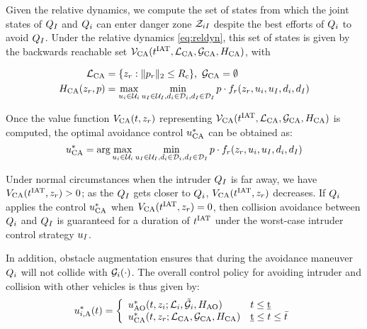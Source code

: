 Given the relative dynamics, we compute the set of states from which the joint states of $Q_{I}$ and $Q_i$ can enter danger zone $\mathcal{Z}_{iI}$ despite the best efforts of $Q_i$ to avoid $Q_{I}$. Under the relative dynamics \eqref{eq:reldyn}, this set of states is given by the backwards reachable set $\mathcal{V}_\text{CA}(t^\text{IAT}, \mathcal{L}_\text{CA}, \mathcal{G}_\text{CA}, H_\text{CA})$, with

\begin{equation}
\begin{aligned}
\mathcal{L}_\text{CA} &= \{z_r: \|p_r\|_2 \le R_c\},~\mathcal{G}_\text{CA} = \emptyset \\
H_\text{CA}(z_r, p) &= \max_{u_i \in \mathcal{U}_i} \min_{u_I \in \mathcal{U}_I, d_i \in \mathcal{D}_i, d_I \in \mathcal{D}_I} p \cdot f_r(z_r, u_i, u_I, d_i, d_I)
\end{aligned}
\end{equation}

Once the value function $V_\text{CA}(t, z_r)$ representing $\mathcal{V}_\text{CA}(t^\text{IAT}, \mathcal{L}_\text{CA}, \mathcal{G}_\text{CA}, H_\text{CA})$ is computed, the optimal avoidance control $u^*_\text{CA}$ can be obtained as:
\begin{equation}
u^*_\text{CA} = \arg \max_{u_i \in \mathcal{U}_i} \min_{u_I \in \mathcal{U}_I, d_i \in \mathcal{D}_i, d_I \in \mathcal{D}_I} p \cdot f_r(z_r, u_i, u_I, d_i, d_I)
\end{equation}

Under normal circumstances when the intruder $Q_{I}$ is far away, we have $V_\text{CA}(t^\text{IAT}, z_r) > 0$; as the $Q_{I}$ gets closer to $Q_i$, $V_\text{CA}(t^\text{IAT}, z_r)$ decreases. If $Q_i$ applies the control $u^*_\text{CA}$ when $V_\text{CA}(t^\text{IAT}, z_r) = 0$, then collision avoidance between $Q_i$ and $Q_{I}$ is guaranteed for a duration of $t^\text{IAT}$ under the worst-case intruder control strategy $u_I$.

In addition, obstacle augmentation ensures that during the avoidance maneuver $Q_i$ will not collide with $\mathcal{G}_i(\cdot)$. %
The overall control policy for avoiding intruder and collision with other vehicles is thus given by:
\begin{equation*}
u^*_{i, \text{A}}(t) = 
\left \{ 
\begin{array}{ll}
u^*_\text{AO}(t, z_i; \mathcal{L}_i, \tilde{\mathcal{G}}_i, H_\text{AO}) & t \leq \underbar{t}\\
u^*_\text{CA}(t, z_r; \mathcal{L}_\text{CA}, \mathcal{G}_\text{CA}, H_\text{CA}) & \underbar{t} \leq t \leq \bar{t}
\end{array}
\right.
\end{equation*}

